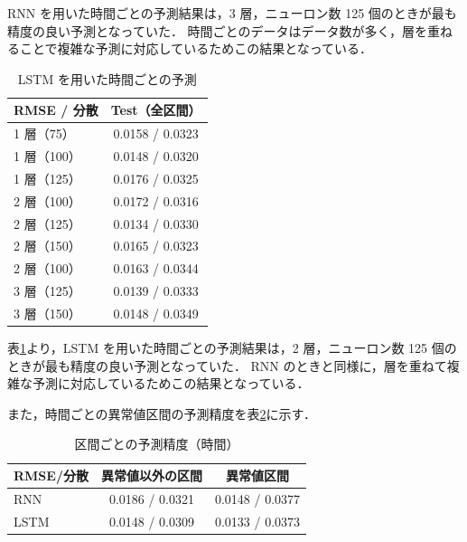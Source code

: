 \documentclass[twocolumn,fleqn,10pt]{jarticle}
\begin{document}
RNN を用いた時間ごとの予測結果は，3 層，ニューロン数 125 個のときが最も精度の良い予測となっていた．
時間ごとのデータはデータ数が多く，層を重ねることで複雑な予測に対応しているためこの結果となっている．






\begin{table}[t]
\centering
  \caption{LSTM を用いた時間ごとの予測}
  \vspace{3mm}
  \begin{tabular}{|l||c|}  \hline
    RMSE / 分散 & Test（全区間） \\ \hline \hline
    1 層（75）  & 0.0158 / 0.0323 \\ \hline
    1 層（100） & 0.0148 / 0.0320 \\ \hline
    1 層（125） & 0.0176 / 0.0325 \\ \hline

    2 層（100） & 0.0172 / 0.0316 \\ \hline
    2 層（125） & 0.0134 / 0.0330 \\ \hline
    2 層（150） & 0.0165 / 0.0323 \\ \hline

    2 層（100） & 0.0163 / 0.0344 \\ \hline
    3 層（125） & 0.0139 / 0.0333 \\ \hline
    3 層（150） & 0.0148 / 0.0349 \\ \hline
  \end{tabular}
  \label{tab:lstm-time}
\end{table}


表\ref{tab:lstm-time}より，LSTM を用いた時間ごとの予測結果は，2 層，ニューロン数 125 個のときが最も精度の良い予測となっていた．
RNN のときと同様に，層を重ねて複雑な予測に対応しているためこの結果となっている．


また，時間ごとの異常値区間の予測精度を表\ref{tab:ijou-time}に示す．



\begin{table}[t]
\centering
  \caption{区間ごとの予測精度（時間）}
  \vspace{3mm}
  \begin{tabular}{|l||c|c|}  \hline
    RMSE/分散  & 異常値以外の区間 & 異常値区間 \\ \hline \hline
    RNN   &  0.0186 / 0.0321 & 0.0148 / 0.0377 \\ \hline
    LSTM  &  0.0148 / 0.0309 & 0.0133 / 0.0373 \\ \hline
  \end{tabular}
  \label{tab:ijou-time}
\end{table}
\end{document}
